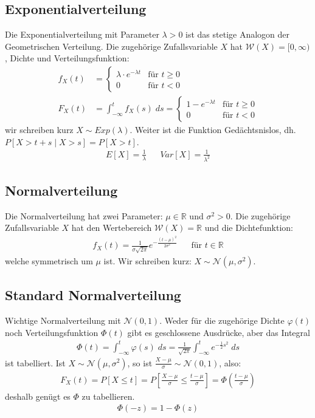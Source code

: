 \documentclass[8pt]{extarticle}
\newcommand{\R}{\mathbb{R}}
\newcommand{\W}{\mathcal{W}}
\newcommand{\vp}{\varphi}
\newcommand{\cond}[2]{P[#1 \; | \; #2]}
\newcommand{\Normalverteilt}{\mathcal{N}  (\mu, \sigma^2)}
\newcommand{\Standardnormalverteilt}{\mathcal{N}  (0, 1)}
\begin{document}
\begin{multicols*}{3}
  \subsection*{Exponentialverteilung}
  Die Exponentialverteilung mit Parameter $\lambda > 0$ ist das stetige Analogon
  der Geometrischen Verteilung. Die zugehörige Zufallsvariable $X$ hat $\W (X) =
    [0, \infty)$, Dichte und Verteilungsfunktion:
  \begin{align*}
    f_X (t) & =
    \begin{cases}
      \lambda \cdot e^{-\lambda t} & \text{für } t \geq 0 \\
      0                            & \text{für }t < 0
    \end{cases} \\
    F_X (t) & =
    \int_{-\infty}^t f_X (s) \; ds =
    \begin{cases}
      1 - e^{-\lambda t} & \text{für } t \geq 0 \\
      0                  & \text{für }t < 0
    \end{cases}
  \end{align*}
  wir schreiben kurz $X \sim Exp (\lambda)$. Weiter ist
  die Funktion Gedächtsnislos, dh. $\cond{X > t + s}{X > s} = P[X > t]$.
  \begin{align*}
    E[X] = \frac{1}{\lambda} &  & Var[X] = \frac{1}{\lambda^2}
  \end{align*}
  \subsection*{Normalverteilung}
  Die Normalverteilung hat zwei Parameter: $\mu \in \R$ und $\sigma^2 > 0$. Die
  zugehörige Zufallsvariable $X$ hat den Wertebereich $\W (X) = \R$ und die
  Dichtefunktion:
  \begin{align*}
    f_X (t) = \frac{1}{\sigma \sqrt{2 \pi}} e^{- \frac{ (t - \mu)^2}{2 \sigma^2}}
     &  & \text{für } t \in \R
  \end{align*}
  welche symmetrisch um $\mu$ ist. Wir schreiben kurz: $X \sim \Normalverteilt$.
  \subsection*{Standard Normalverteilung}
  Wichtige Normalverteilung mit $\Standardnormalverteilt$. Weder für die
  zugehörige Dichte $\vp (t)$ noch Verteilungsfunktion $\Phi (t)$ gibt es
  geschlossene Ausdrücke, aber das Integral
  \begin{align*}
    \Phi (t) = \int_{-\infty}^t \vp (s) \; ds =
    \frac{1}{\sqrt{2\pi}} \int_{-\infty}^t e^{-\frac{1}{2} s^2} \; ds
  \end{align*}
  ist tabelliert. Ist $X \sim \Normalverteilt$, so ist
  $\frac{X - \mu}{\sigma} \sim \Standardnormalverteilt$, also:
  \begin{align*}
    F_X (t) = P[X \leq t] = P \left[ \frac{X-\mu}{\sigma} \leq \frac{t - \mu}{\sigma} \right] = \Phi \left  ( \frac{t - \mu}{\sigma} \right)
  \end{align*}
  deshalb genügt es $\Phi$ zu tabellieren.
  \begin{align*}
    \Phi (-z) = 1 - \Phi (z)
  \end{align*}

\end{multicols*}
\end{document}
